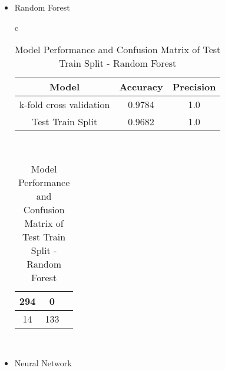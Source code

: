 \documentclass{article}
\begin{document}
\begin{itemize}
\begin{itemize}
\begin{table}[htbp]
\begin{tabular}{c}
                \begin{tabular}{|c|c|c|}
                \hline
                432  & 14 \\
                \hline
                36 & 180 \\
                \hline
                \end{tabular} \\
            \end{tabular}
            \caption{Model Performance and Confusion Matrix of Test Train Split - SVM}
            \label{tab:combined_table}
            \end{table}

        \item Random Forest
            \begin{table}[htbp]
            \centering
            \begin{tabular}{c} %
                \begin{tabular}{|c|c|c|}
                \hline
                Model & Accuracy & Precision \\
                \hline
                k-fold cross validation & 0.9784 & 1.0 \\
                \hline
                Test Train Split & 0.9682 & 1.0 \\
                \hline
                \end{tabular}
                \vspace{5mm} \\ %

                
                \begin{tabular}{|c|c|c|}
                \hline
                294 & 0 \\
                \hline
                14 & 133 \\
                \hline
                \end{tabular} \\
            \end{tabular}
            \caption{Model Performance and Confusion Matrix of Test Train Split - Random Forest}
            \label{tab:combined_table}
            \end{table}
        
        \item Neural Network
            

\end{itemize}
\end{itemize}
\end{document}
